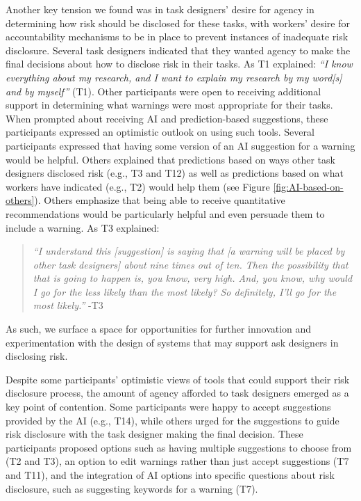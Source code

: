 
Another key tension we found was in task designers' desire for agency in determining how risk should be disclosed for these tasks, with workers' desire for accountability mechanisms to be in place to prevent instances of inadequate risk disclosure. Several task designers indicated that they wanted agency to make the final decisions about how to disclose risk in their tasks. As T1 explained: \textit{``I know everything about my research, and I want to explain my research by my word[s] and by myself''} (T1). Other participants were open to receiving additional support in determining what warnings were most appropriate for their tasks. When prompted about receiving AI and prediction-based suggestions, these participants expressed an optimistic outlook on using such tools. Several participants expressed that having some version of an AI suggestion for a warning would be helpful. Others explained that predictions based on ways other task designers disclosed risk (e.g., T3 and T12) as well as predictions based on what workers have indicated (e.g., T2) would help them (see Figure \ref{fig:AI-based-on-others}). Others emphasize that being able to receive quantitative recommendations would be particularly helpful and even persuade them to include a warning. As T3 explained:
\begin{quote}
    \textit{``I understand this [suggestion] is saying that [a warning will be placed by other task designers] about nine times out of ten. Then the possibility that that is going to happen is, you know, very high. And, you know, why would I go for the less likely than the most likely? So definitely, I'll go for the most likely.''} -T3
\end{quote}
As such, we surface a space for opportunities for further innovation and experimentation with the design of systems that may support ask designers in disclosing risk.

Despite some participants' optimistic views of tools that could support their risk disclosure process, the amount of agency afforded to task designers emerged as a key point of contention. Some participants were happy to accept suggestions provided by the AI (e.g., T14), while others urged for the suggestions to guide risk disclosure with the task designer making the final decision. These participants proposed options such as having multiple suggestions to choose from (T2 and T3), an option to edit warnings rather than just accept suggestions (T7 and T11), and the integration of AI options into specific questions about risk disclosure, such as suggesting keywords for a warning (T7). 

